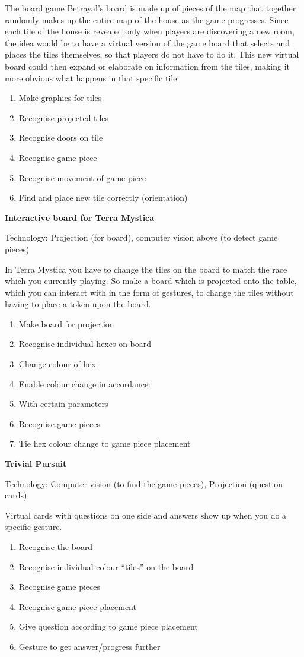 The board game Betrayal’s board is made up of pieces of the map that together randomly makes up the entire map of the house as the game progresses. Since each tile of the house is revealed only when players are discovering a new room, the idea would be to have a virtual version of the game board that selects and places the tiles themselves, so that players do not have to do it. This new virtual board could then expand or elaborate on information from the tiles, making it more obvious what happens in that specific tile.
\begin{enumerate}
\item Make graphics for tiles
\item Recognise projected tiles
\item Recognise doors on tile
\item Recognise game piece
\item Recognise movement of game piece
\item Find and place new tile correctly (orientation)
\end{enumerate}


\textbf{Interactive board for Terra Mystica} 

Technology: Projection (for board), computer vision above (to detect game pieces)

In Terra Mystica you have to change the tiles on the board to match the race which you currently playing. So make a board which is projected onto the table, which you can interact with in the form of gestures, to change the tiles without having to place a token upon the board.
\begin{enumerate}
\item Make board for projection
\item Recognise individual hexes on board
\item Change colour of hex
\item Enable colour change in accordance \item With certain parameters
\item Recognise game pieces
\item Tie hex colour change to game piece placement
\end{enumerate} 


\textbf{Trivial Pursuit}
 
Technology: Computer vision (to find the game pieces), Projection (question cards)

Virtual cards with questions on one side and answers show up when you do a specific gesture.
\begin{enumerate}
\item Recognise the board
\item Recognise individual colour “tiles” on the board
\item Recognise game pieces
\item Recognise game piece placement 
\item Give question according to game piece placement
\item Gesture to get answer/progress further
\end{enumerate}


